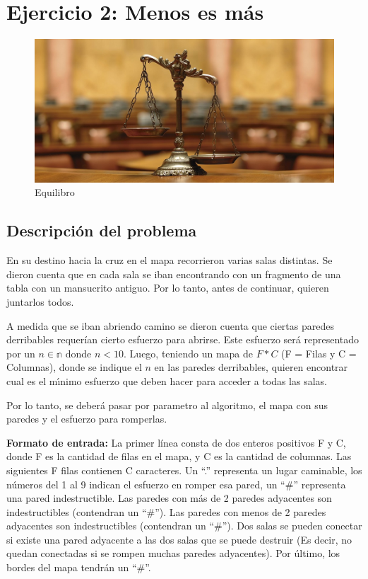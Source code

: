 
\section{Ejercicio 2: Menos es más}

	\begin{figure}[ht]
		\begin{center}
			\includegraphics[width=0.5\columnwidth]{imagenes/balanza.jpg}
			\caption{Equilibro}
		\end{center}
	\end{figure}

	\subsection{Descripción del problema}
	En su destino hacia la cruz en el mapa recorrieron varias salas distintas. Se dieron cuenta que en cada sala se iban encontrando con un fragmento de una tabla con un mansucrito antiguo. Por lo tanto, antes de continuar, quieren juntarlos todos.\par
	A medida que se iban abriendo camino se dieron cuenta que ciertas paredes derribables requerían cierto esfuerzo para
	abrirse. Este esfuerzo será representado por un $n\in{\mathbb{n}}$ donde $n < 10$. Luego, teniendo un mapa de $F*C$ (F = Filas y C = Columnas), donde se indique el $n$ en las paredes derribables, quieren encontrar cual es el mı́nimo esfuerzo que deben hacer para acceder a todas las salas. \par

	Por lo tanto, se deberá pasar por parametro al algoritmo, el mapa con sus paredes y el esfuerzo para romperlas. 
	\newline
	~

	\textbf{Formato de entrada:} La primer línea consta de dos enteros positivos F y C, donde F es la cantidad de filas en el mapa, y C es la cantidad de columnas. Las siguientes F filas contienen C caracteres. Un “.” representa un lugar caminable, los números del 1 al 9 indican el esfuerzo en romper esa pared, un “\#” representa una pared indestructible. Las paredes con más de 2 paredes adyacentes son indestructibles (contendran un “\#”). Las paredes con menos de 2 paredes adyacentes son indestructibles (contendran un “\#”). Dos salas se pueden conectar si existe una pared adyacente a las dos salas que se puede destruir (Es decir, no quedan conectadas si se rompen muchas paredes adyacentes). Por último, los bordes del mapa tendrán un “\#”.


